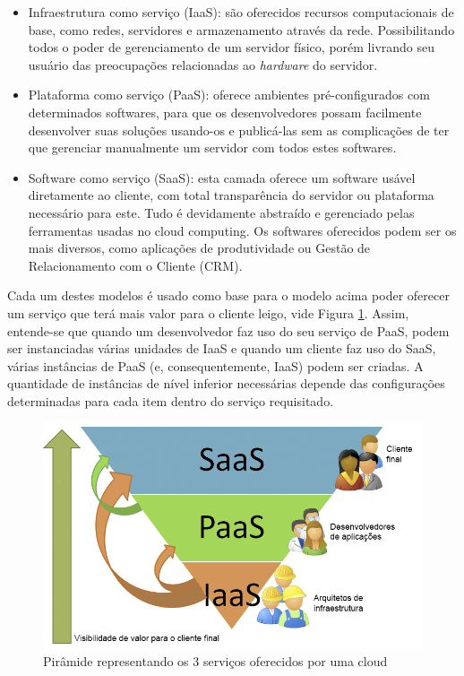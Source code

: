 \begin{itemize}
    \item Infraestrutura como serviço (IaaS): são oferecidos recursos computacionais de base,
    como redes, servidores e armazenamento através da rede. Possibilitando todos o poder
    de gerenciamento de um servidor físico, porém livrando seu usuário das preocupações
    relacionadas ao \emph{hardware} do servidor.

    \item Plataforma como serviço (PaaS): oferece ambientes pré-configurados com determinados
    softwares, para que os desenvolvedores possam facilmente desenvolver suas soluções
    usando-os e publicá-las sem as complicações de ter que gerenciar manualmente um servidor
    com todos estes softwares.

    \item Software como serviço (SaaS): esta camada oferece um software usável diretamente
    ao cliente, com total transparência do servidor ou plataforma necessário para este. Tudo é devidamente
    abstraído e gerenciado pelas ferramentas usadas no cloud computing. Os softwares oferecidos
    podem ser os mais diversos, como aplicações de produtividade ou Gestão de Relacionamento
    com o Cliente (CRM).

\end{itemize}

Cada um destes modelos é usado como base para o modelo acima poder oferecer um serviço
que terá mais valor para o cliente leigo, vide Figura \ref{img:piramide-cloud}. Assim,
entende-se que quando um desenvolvedor faz uso do seu serviço de PaaS, podem ser instanciadas
várias unidades de IaaS e quando um cliente faz uso do SaaS, várias instâncias de PaaS (e,
consequentemente, IaaS) podem ser criadas. A quantidade de instâncias de nível inferior
necessárias depende das configurações determinadas para cada item dentro do serviço
requisitado.

\begin{figure}[h]
  \center
  \includegraphics[scale=0.35]{imagem/piramide-cloud.png}
  \caption{Pirâmide representando os 3 serviços oferecidos por uma cloud}
  \label{img:piramide-cloud}
\end{figure}

